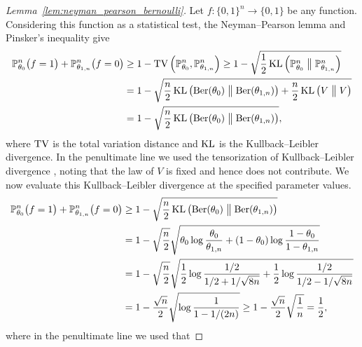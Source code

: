 \begin{proof}[Lemma~\ref{lem:neyman_pearson_bernoulli}]

  Let $f: \{0,1\}^n \to \{0,1\}$
  be any function.
  Considering this function as a statistical test,
  the Neyman--Pearson lemma
  and Pinsker's inequality
  \citep{gine2021mathematical}
  give
  \begin{align*}
    \mathbb{P}_{\theta_0}^n \big(
    f=1
    \big)
    +\mathbb{P}_{\theta_{1,n}}^n \big(
    f=0
    \big)
    &\geq
    1-
    \mathrm{TV}\left(
      \mathbb{P}_{\theta_0}^n,
      \mathbb{P}_{\theta_{1,n}}^n
    \right)
    \geq
    1-
    \sqrt{
      \frac{1}{2}
      \operatorname{KL} \left(
        \mathbb{P}_{\theta_0}^n
        \bigm\|
        \mathbb{P}_{\theta_{1,n}}^n
      \right)} \\
    &=
    1-
    \sqrt{
      \frac{n}{2}
      \operatorname{KL} \left(
        \operatorname{Ber}(\theta_0)
        \bigm\|
        \operatorname{Ber}(\theta_{1,n})
      \right)
      + \frac{n}{2}
      \operatorname{KL} \left(
        V
        \bigm\|
        V
      \right)} \\
    &=
    1-
    \sqrt{
      \frac{n}{2}
      \operatorname{KL} \left(
        \operatorname{Ber}(\theta_0)
        \bigm\|
        \operatorname{Ber}(\theta_{1,n})
      \right)},
  \end{align*}
  where $\mathrm{TV}$ is the total variation distance
  and $\operatorname{KL}$ is the Kullback--Leibler divergence.
  In the penultimate line
  we used the tensorization of Kullback--Leibler divergence
  \citep{gine2021mathematical},
  noting that the law of $V$ is fixed and hence does not contribute.
  We now evaluate this Kullback--Leibler divergence at the specified
  parameter values.
  \begin{align*}
    \mathbb{P}_{\theta_0}^n \big(
    f=1
    \big)
    +\mathbb{P}_{\theta_{1,n}}^n \big(
    f=0
    \big)
    &\geq
    1-
    \sqrt{
      \frac{n}{2}
      \operatorname{KL} \left(
        \operatorname{Ber}(\theta_0)
        \bigm\|
        \operatorname{Ber}(\theta_{1,n})
      \right)} \\
    &=
    1-
    \sqrt{\frac{n}{2}}
    \sqrt{
      \theta_0 \log \frac{\theta_0}{\theta_{1,n}}
      + (1 - \theta_0) \log \frac{1 - \theta_0}{1 - \theta_{1,n}}} \\
    &=
    1-
    \sqrt{\frac{n}{2}}
    \sqrt{
      \frac{1}{2} \log \frac{1/2}{1/2 + 1/\sqrt{8n}}
      + \frac{1}{2} \log \frac{1/2}{1/2 - 1/\sqrt{8n}}} \\
    &=
    1-
    \frac{\sqrt n}{2}
    \sqrt{\log \frac{1}{1 - 1/(2n)}}
    \geq
    1-
    \frac{\sqrt n}{2}
    \sqrt{\frac{1}{n}}
    =
    \frac{1}{2},
  \end{align*}
  where in the penultimate line we used that

\end{proof}
